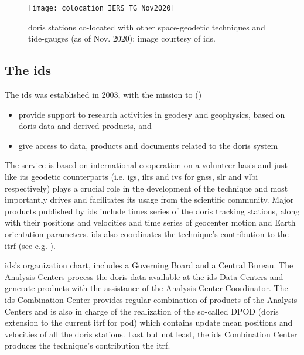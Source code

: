 \begin{figure}[h]
  \centering
  \texttt{[image: colocation\_IERS\_TG\_Nov2020]}
  \caption{\gls{doris} stations co-located with other space-geodetic techniques 
    and tide-gauges (as of Nov. 2020); image courtesy of \gls{ids}.}
  \label{fig:doris-network-ties}
\end{figure}

\subsection{The \gls{ids}}\label{ssec:ids}
The \gls{ids} was established in 2003, with the mission to (\cite{Soudarin2019})
\begin{itemize}
  \item provide support to research activities in geodesy and geophysics, based 
    on \gls{doris} data and derived products, and
  \item give access to data, products and documents related to the \gls{doris} system
\end{itemize}

The service is based on international cooperation on a volunteer basis and just like 
its geodetic counterparts (i.e. \gls{igs}, \gls{ilrs} and \gls{ivs} for \gls{gnss}, 
\gls{slr} and \gls{vlbi} respectively) plays a crucial role in the development of 
the technique and most importantly drives and facilitates its usage from the scientific 
community. Major products published by \gls{ids} include times series of the \gls{doris} 
tracking stations, along with their positions and velocities  and time series of 
geocenter motion and Earth orientation parameters. \gls{ids} also coordinates the 
technique's contribution to the \gls{itrf} (see e.g. \cite{Moreaux2022}).

\gls{ids}'s organization chart, includes a Governing Board and a Central Bureau.
The Analysis Centers process the \gls{doris} data available at the \gls{ids} Data 
Centers and generate products with the assistance of the Analysis Center Coordinator.
The \gls{ids} Combination Center provides regular combination of products of 
the Analysis Centers and is also in charge of the realization of the so-called 
DPOD (\gls{doris} extension to the current \gls{itrf} for \gls{pod}) 
which contains update mean positions and velocities of all the \gls{doris} stations. 
Last but not least, the \gls{ids} Combination Center produces the technique's 
contribution the \gls{itrf}.

\iffalse
\fi
